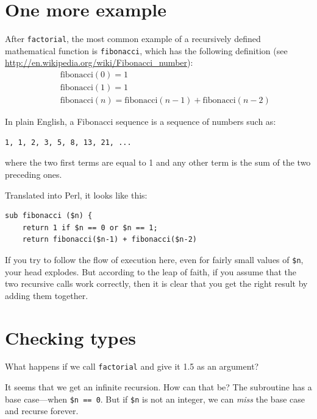 \section{One more example}
\label{one.more.example}

After {\tt factorial}, the most common example of a recursively
defined mathematical function is {\tt fibonacci}, which has the
following definition (see
  \url{http://en.wikipedia.org/wiki/Fibonacci_number}):
%
\begin{eqnarray*}
&& \mathrm{fibonacci}(0) = 1 \\
&& \mathrm{fibonacci}(1) = 1 \\
&& \mathrm{fibonacci}(n) = \mathrm{fibonacci}(n-1) + \mathrm{fibonacci}(n-2)
\end{eqnarray*}
%

In plain English, a Fibonacci sequence is a sequence of numbers 
such as:
\begin{verbatim}
1, 1, 2, 3, 5, 8, 13, 21, ...
\end{verbatim}
where the two first terms are equal to 1 and any other term is the 
sum of the two preceding ones.

Translated into Perl, it looks like this:

\begin{verbatim}
sub fibonacci ($n) {
    return 1 if $n == 0 or $n == 1;
    return fibonacci($n-1) + fibonacci($n-2)
\end{verbatim}
%
If you try to follow the flow of execution here, even for fairly
small values of \verb'$n', your head explodes.  But according to the
leap of faith, if you assume that the two recursive calls
work correctly, then it is clear that you get
the right result by adding them together.


\section{Checking types}
\label{guardian}

What happens if we call {\tt factorial} and give it 1.5 as an argument?

It seems that we get an infinite recursion.  How can that be? 
The subroutine has a base case---when {\tt \$n == 0}.  But if {\tt \$n} 
is not an integer, we can {\em miss} the base case and recurse forever.

